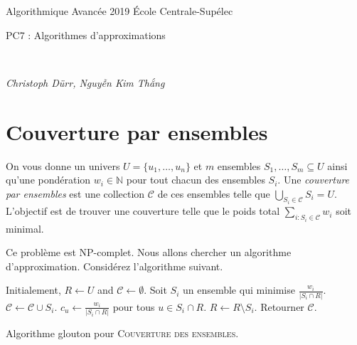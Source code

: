 \documentclass[12pt]{article}
\newcommand{\MakeScribeTop}[1]{
\noindent
\begin{framed}
\noindent
 Algorithmique Avancée 2019
 \hfill
 École Centrale-Supélec
 \\[1em]
 \centerline{ \Large
#1
 }
 \\[1em]
\centerline{  \it Christoph Dürr, Nguyễn Kim Thắng}
\end{framed}
}
\begin{document}
    \MakeScribeTop{PC7 : Algorithmes d'approximations}



\section{Couverture par ensembles}

\begin{figwindow}
On vous donne un univers $U = \{u_{1}, \ldots, u_{n}\}$ et $m$ ensembles 
$S_{1}, \ldots, S_{m}\subseteq U$ ainsi qu'une pondération $w_{i}\in \mathbb N$ pour tout chacun des ensembles $S_i$.
Une \emph{couverture par ensembles} est une collection $\mathcal{C}$ de
ces ensembles telle que $\bigcup_{S_{i} \in \mathcal{C}} S_{i} = U$. 
L'objectif est de trouver une couverture telle que le poids total 
$\sum_{i:S_{i} \in \mathcal{C}} w_{i}$ soit minimal.	

Ce problème est NP-complet. Nous allons chercher un algorithme d'approximation.
Considérez l'algorithme suivant.
\end{figwindow}

\vspace{1cm}


\begin{algorithm}[ht]
\begin{algorithmic}[1]  
\STATE Initialement, $R \gets U$ and $\mathcal{C} \gets \emptyset$. 
	\STATE Soit $S_{i}$ un ensemble qui minimise $\frac{w_{i}}{|S_{i} \cap R|}$.
	\STATE $\mathcal{C} \gets \mathcal{C} \cup S_{i}$.
	\STATE $c_{u} \gets \frac{w_{i}}{|S_{i} \cap R|}$ pour tous $u \in S_{i} \cap R$. 
	\STATE $R \gets R \setminus S_{i}$.
\ENDWHILE
\STATE Retourner $\mathcal{C}$.
\end{algorithmic}
\caption{Algorithme glouton pour \textsc{Couverture des ensembles}.}
\label{algo:covering}
\end{algorithm}
\end{document}
